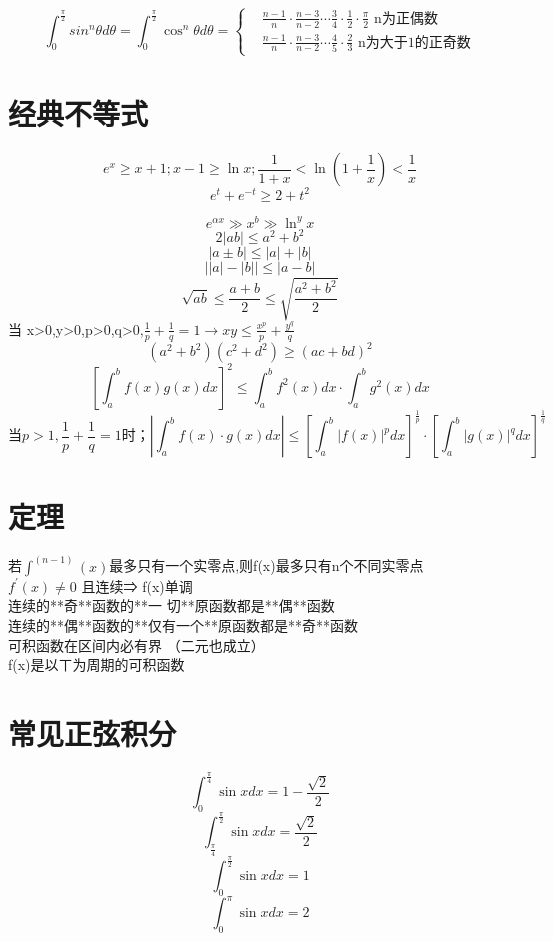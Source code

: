 \documentclass[UTF8]{ctexart}
\begin{document}
$$ \int_0^\frac{\pi}{2} sin^n θ d \theta =\int_0^\frac{\pi}{2} \cos^n \theta d \theta =
\begin{cases}
  &\frac{n-1}{n}\cdot\frac{n-3}{n-2} \cdots \frac{3}{4}\cdot\frac{1}{2}\cdot\frac{\pi}{2}\mbox{  n为正偶数} \\
  &\frac{n-1}{n}\cdot\frac{n-3}{n-2}\cdots\frac{4}{5}\cdot\frac{2}{3}\mbox{  n为大于1的正奇数}
\end{cases}
$$

\section{经典不等式}
$$e^x \geq x+1 ; x-1 \geq \ln x ; \frac{1}{1+x} < \ln \left( 1+ \frac{1}{x} \right) < \frac{1}{x}$$
$$ e^t + e^{-t} \geq 2+t^2 $$

$$ e^{αx} \gg x^b \gg \ln^y x $$
$$ 2\left| ab \right| \leq a^2+b^2$$
$$ \left| a \pm b \right| \leq |a|+|b|$$
$$ \left| |a| - |b| \right| \leq |a-b|$$
$$\sqrt{ab} \leq \frac{a+b}{2} \leq \sqrt{\frac{a^2+b^2}{2}}$$
当 x>0,y>0,p>0,q>0,$\frac{1}{p}+\frac{1}{q}=1 \rightarrow xy \leq \frac{x^p}{p}+\frac{y^q}{q}$
$$(a^2+b^2)(c^2+d^2) \geq (ac+bd)^2$$
$$ [\int_a^b f(x)g(x)dx]^2 \leq \int_a^b f^2(x)dx\cdot \int_a^b g^2(x)dx$$
$$\mbox{当} p>1, \frac{1}{p}+\frac{1}{q}=1 \mbox{时；} \left| \int_a^b f(x) \cdot g(x)dx\right| \leq \left[ \int_a^b \left| f(x) \right|^p dx \right] ^\frac{1}{p} \cdot \left[ \int_a^b \left| g(x) \right|^q dx \right] ^\frac{1}{q}$$

\section{定理}
​若$\int^{(n-1)}(x)$最多只有一个实零点,则f(x)最多只有n个不同实零点 \\
$f^′(x)≠0$ 且连续⇒ f(x)单调 \\
连续的**奇**函数的**一  切**原函数都是**偶**函数 \\
连续的**偶**函数的**仅有一个**原函数都是**奇**函数 \\
可积函数在区间内必有界 （二元也成立） \\
f(x)是以ㄒ为周期的可积函数 \\

\section{常见正弦积分}

$$ \int_0^\frac{\pi}{4} \sin x dx =1- \frac{\sqrt{2}}{2}$$
$$ \int_\frac{\pi}{4}^\frac{\pi}{2} \sin x dx =\frac{\sqrt{2}}{2}$$
$$ \int_0^\frac{\pi}{2} \sin x dx = 1$$
$$ \int_0^\pi \sin x dx =2$$
\end{document}
